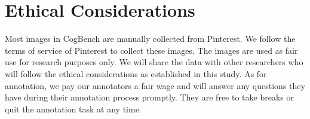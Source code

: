 \section*{Ethical Considerations}

Most images in CogBench are manually collected from Pinterest. 
We follow the terms of service of Pinterest to collect these images.
The images are used as fair use for research purposes only.
We will share the data with other researchers who will follow the ethical considerations as established in this study.
As for annotation, we pay our annotators a fair wage and will answer any questions they have during their annotation process promptly. 
They are free to take breaks or quit the annotation task at any time.